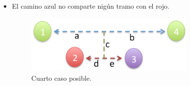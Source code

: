 \begin{itemize}
\begin {itemize}
\begin{itemize}
\begin{figure}[H]
\begin{minipage}[H]{240pt}
\end{minipage}
\hfill
\caption{Tercer caso posible.}
\end{figure}
Supongamos que el algoritmo $BFS$ devuelve el nodo 3 como el más alejado al 2. Entonces, podemos deducir que:
\begin {itemize}
\item $c$ = $d$: Ambas soluciones son correctas.
\item $c > d$: Si este caso ocurriera, $c$ debería formar parte del camino máximo del árbol. Luego, el camino azul no sería el máximo. Por lo tanto, resulta absurdo suponer que el extremo del camino máximo otorgado por $BFS$ no pertencía al camino máximo del árbol. \newline
\end{itemize}
\item El camino azul no comparte nigún tramo con el rojo.
\begin{figure}[H] %
\begin{minipage}[H]{240pt}
\includegraphics[width=240pt]{../imgs/ej2casos03.jpg}
\end{minipage}
\hfill
\caption{Cuarto caso posible.}
\end{figure}
\end{itemize}
\end{itemize}


\end{itemize}
